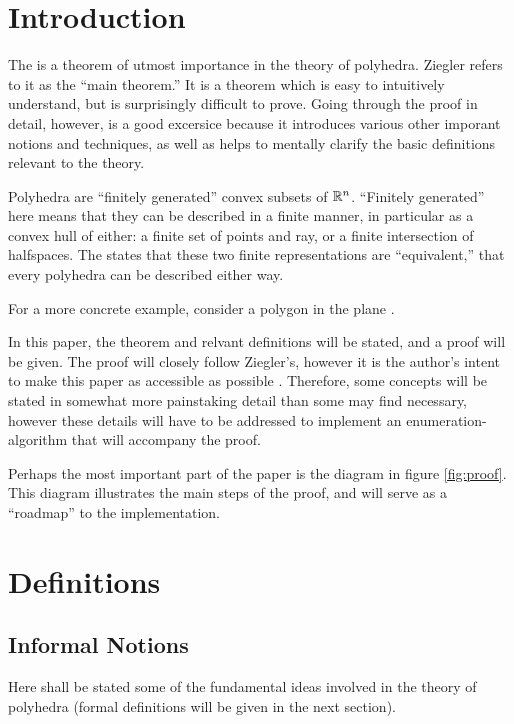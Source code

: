 \documentclass[a4,fleqn]{article}
\begin{document}


\section{Introduction}

The \MWT{} is a theorem of utmost importance in the theory of polyhedra.  Ziegler refers to it as the ``main theorem.''  It is a theorem which is easy to intuitively understand, but is surprisingly difficult to prove.  Going through the proof in detail, however, is a good excersice because it introduces various other imporant notions and techniques, as well as helps to mentally clarify the basic definitions relevant to the theory.

Polyhedra are ``finitely generated'' convex subsets of $\mathbb{R}^n$.  ``Finitely generated'' here means that they can be described in a finite manner, in particular as a convex hull of either: a finite set of points and ray, or a finite intersection of halfspaces.  The \MWT{} states that these two finite representations are ``equivalent,'' that every polyhedra can be described either way.

For a more concrete example, consider a polygon in the plane .

In this paper, the theorem and relvant definitions will be stated, and a proof will be given.  The proof will closely follow Ziegler's, however it is the author's intent to make this paper as accessible as possible .  Therefore, some concepts will be stated in somewhat more painstaking detail than some may find necessary, however these details will have to be addressed to implement an enumeration-algorithm that will accompany the proof.

Perhaps the most important part of the paper is the diagram in figure \ref{fig:proof}.  This diagram illustrates the main steps of the proof, and will serve as a ``roadmap'' to the implementation.

\section{Definitions}
\subsection{Informal Notions}

Here shall be stated some of the fundamental ideas involved in the theory of polyhedra (formal definitions will be given in the next section).
\end{document}
